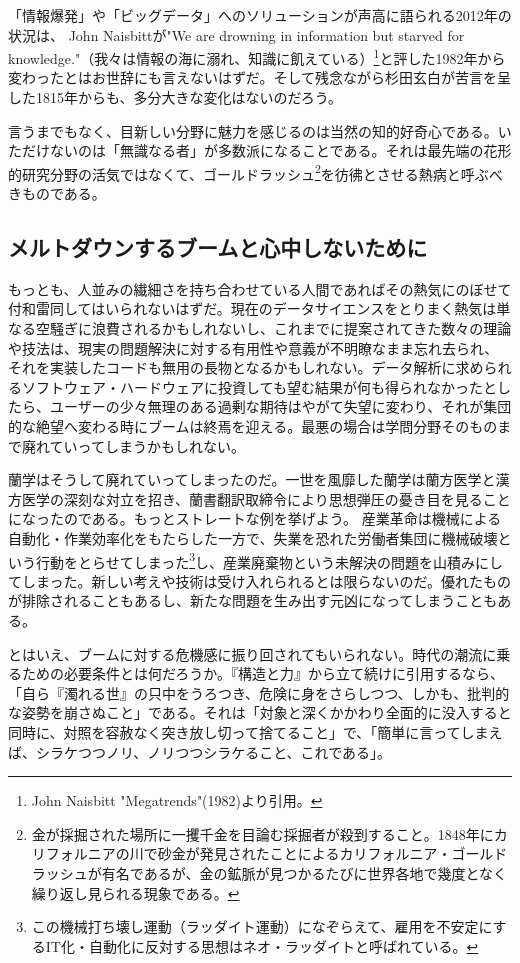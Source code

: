 「情報爆発」や「ビッグデータ」へのソリューションが声高に語られる2012年の状況は、
John Naisbittが"We are drowning in information but starved for knowledge."（我々は情報の海に溺れ、知識に飢えている）\footnote{John Naisbitt "Megatrends"(1982)より引用。}と評した1982年から変わったとはお世辞にも言えないはずだ。そして残念ながら杉田玄白が苦言を呈した1815年からも、多分大きな変化はないのだろう。

言うまでもなく、目新しい分野に魅力を感じるのは当然の知的好奇心である。いただけないのは「無識なる者」が多数派になることである。それは最先端の花形的研究分野の活気ではなくて、ゴールドラッシュ\footnote{金が採掘された場所に一攫千金を目論む採掘者が殺到すること。1848年にカリフォルニアの川で砂金が発見されたことによるカリフォルニア・ゴールドラッシュが有名であるが、金の鉱脈が見つかるたびに世界各地で幾度となく繰り返し見られる現象である。}を彷彿とさせる熱病と呼ぶべきものである。

\subsection{メルトダウンするブームと心中しないために}
もっとも、人並みの繊細さを持ち合わせている人間であればその熱気にのぼせて付和雷同してはいられないはずだ。現在のデータサイエンスをとりまく熱気は単なる空騒ぎに浪費されるかもしれないし、これまでに提案されてきた数々の理論や技法は、現実の問題解決に対する有用性や意義が不明瞭なまま忘れ去られ、それを実装したコードも無用の長物となるかもしれない。データ解析に求められるソフトウェア・ハードウェアに投資しても望む結果が何も得られなかったとしたら、ユーザーの少々無理のある過剰な期待はやがて失望に変わり、それが集団的な絶望へ変わる時にブームは終焉を迎える。最悪の場合は学問分野そのものまで廃れていってしまうかもしれない。

蘭学はそうして廃れていってしまったのだ。一世を風靡した蘭学は蘭方医学と漢方医学の深刻な対立を招き、蘭書翻訳取締令により思想弾圧の憂き目を見ることになったのである。もっとストレートな例を挙げよう。
産業革命は機械による自動化・作業効率化をもたらした一方で、失業を恐れた労働者集団に機械破壊という行動をとらせてしまった\footnote{この機械打ち壊し運動（ラッダイト運動）になぞらえて、雇用を不安定にするIT化・自動化に反対する思想はネオ・ラッダイトと呼ばれている。}し、産業廃棄物という未解決の問題を山積みにしてしまった。新しい考えや技術は受け入れられるとは限らないのだ。優れたものが排除されることもあるし、新たな問題を生み出す元凶になってしまうこともある。

とはいえ、ブームに対する危機感に振り回されてもいられない。時代の潮流に乗るための必要条件とは何だろうか。『構造と力』から立て続けに引用するなら、「自ら『濁れる世』の只中をうろつき、危険に身をさらしつつ、しかも、批判的な姿勢を崩さぬこと」である。それは「対象と深くかかわり全面的に没入すると同時に、対照を容赦なく突き放し切って捨てること」で、「簡単に言ってしまえば、シラケつつノリ、ノリつつシラケること、これである」。

